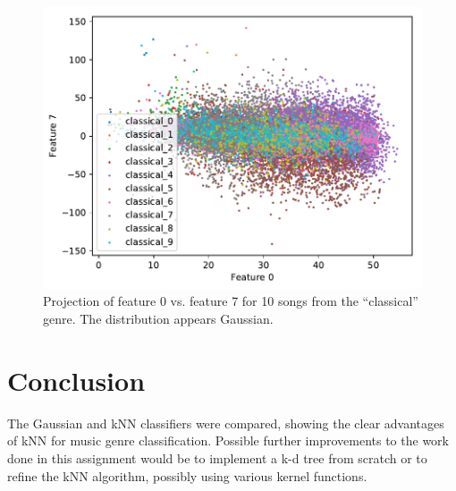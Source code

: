 \documentclass[a4paper,titlepage]{article}
\begin{document}
	\begin{figure}[!htb]
	\centering
	\includegraphics[width=\columnwidth]{plots/classical_gaussian.pdf}
	\caption
	{Projection of feature 0 vs. feature 7 for 10 songs from the ``classical'' genre. The distribution appears Gaussian.}
	\label{fig:classical_gaussian}
	\end{figure}

	\section*{Conclusion}
	
	The Gaussian and kNN classifiers were compared, showing the clear advantages of kNN for music genre classification. Possible further improvements to the work done in this assignment would be to implement a k-d tree from scratch or to refine the kNN algorithm, possibly using various kernel functions.
	
	
	
\end{document}
